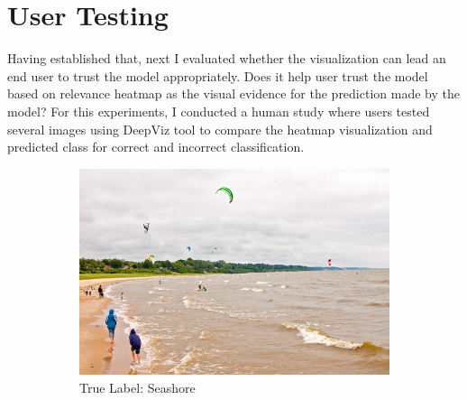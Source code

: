 \section{User Testing}

Having established that, next I evaluated whether the visualization can lead an end user to trust the model appropriately. Does it help user trust the model based on relevance heatmap as the visual evidence for the prediction made by the model? For this experiments, I conducted a human study where users tested several images using DeepViz tool to compare the heatmap visualization and predicted class for correct and incorrect classification.

\begin{figure}
     \centering
     \caption{User Testing Example of Correct and Incorrect Classification}
     \vspace{1em}
     \begin{subfigure}[b]{0.30\textwidth}
         \centering
         \includegraphics[width=\textwidth]{images/seashore.jpeg}
         \caption{True Label: Seashore}
         \label{fig:layer-5}
     \end{subfigure}
     \hspace{1em}%
     \begin{subfigure}[b]{0.30\textwidth}
         \centering

\end{subfigure}
\end{figure}
